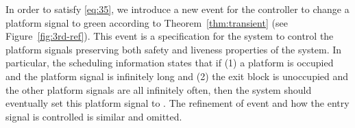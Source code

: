 In order to satisfy \ref{eq:35}, we introduce a new event
\ctrlplf for the controller to change a platform signal to green according to
Theorem~\ref{thm:transient} (see Figure~\ref{fig:3rd-ref}).
This event \ctrlplf is a specification for the system to control the
platform signals preserving both safety and liveness properties of the
system.  In particular, the scheduling information states that if (1)
a platform is occupied and the platform signal is \RED infinitely long
and (2) the exit block is unoccupied and the other platform signals
are all \RED infinitely often, then the system should eventually set
this platform signal to \GREEN.
The refinement of event \movein and how the entry signal is controlled
is similar and omitted.

